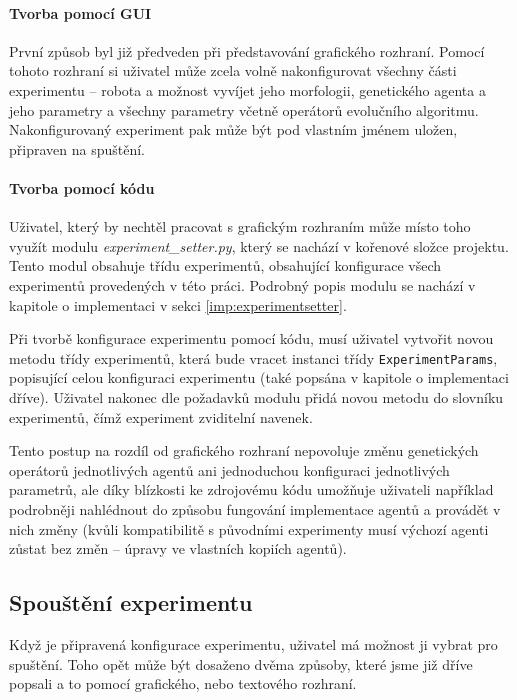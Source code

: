 \paragraph{Tvorba pomocí GUI}
První způsob byl již předveden při představování grafického rozhraní.
Pomocí tohoto rozhraní si uživatel může zcela volně nakonfigurovat všechny
části experimentu -- robota a možnost vyvíjet jeho morfologii, genetického
agenta a jeho parametry a všechny parametry včetně operátorů evolučního
algoritmu. Nakonfigurovaný experiment pak může být pod vlastním jménem uložen,
připraven na spuštění.

\paragraph{Tvorba pomocí kódu}
Uživatel, který by nechtěl pracovat s grafickým rozhraním může místo toho
využít modulu \emph{experiment\_setter.py}, který se nachází v kořenové složce
projektu. Tento modul obsahuje třídu experimentů, obsahující konfigurace všech
experimentů provedených v této práci. Podrobný popis modulu se nachází v
kapitole o implementaci v sekci \ref{imp:experimentsetter}.

Při tvorbě konfigurace experimentu pomocí kódu, musí uživatel vytvořit novou
metodu třídy experimentů, která bude vracet instanci třídy
\texttt{ExperimentParams}, popisující celou konfiguraci experimentu (také
popsána v kapitole o implementaci dříve). Uživatel nakonec dle požadavků modulu
přidá novou metodu do slovníku experimentů, čímž experiment zviditelní navenek.

Tento postup na rozdíl od grafického rozhraní nepovoluje změnu genetických
operátorů jednotlivých agentů ani jednoduchou konfiguraci jednotlivých
parametrů, ale díky blízkosti ke zdrojovému kódu umožňuje uživateli například
podrobněji nahlédnout do způsobu fungování implementace agentů a provádět v
nich změny (kvůli kompatibilitě s původními experimenty musí výchozí agenti
zůstat bez změn -- úpravy ve vlastních kopiích agentů).

\subsection{Spouštění experimentu} \label{doc_22_cooking}

Když je připravená konfigurace experimentu, uživatel má možnost ji vybrat pro
spuštění. Toho opět může být dosaženo dvěma způsoby, které jsme již dříve
popsali a to pomocí grafického, nebo textového rozhraní.

